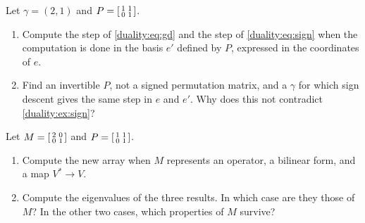 \begin{notechapter}
\begin{exercise}\label{duality:exr:8}
Let $\gamma = (2, 1)$ and $P = \begin{bsmallmatrix}1 & 1\\0 & 1
\end{bsmallmatrix}$.
\begin{enumerate}[nosep]
  \item Compute the step of \eqref{duality:eq:gd} and the step of
        \eqref{duality:eq:sign} when the computation is done in the basis
        $e'$ defined by $P$, expressed in the coordinates of $e$.
  \item Find an invertible $P$, not a signed permutation matrix, and a
        $\gamma$ for which sign descent gives the same step in $e$ and
        $e'$. Why does this not contradict
        \cref{duality:ex:sign}?
\end{enumerate}
\end{exercise}

\begin{exercise}\label{duality:exr:9}
Let $M = \begin{bsmallmatrix}2 & 0\\0 & 1\end{bsmallmatrix}$ and
$P = \begin{bsmallmatrix}1 & 1\\0 & 1\end{bsmallmatrix}$.
\begin{enumerate}[nosep]
  \item Compute the new array when $M$ represents an operator, a bilinear
        form, and a map $V^*\to V$.
  \item Compute the eigenvalues of the three results. In which case are
        they those of $M$? In the other two cases, which properties of
        $M$ survive?
\end{enumerate}
\end{exercise}
\end{notechapter}
